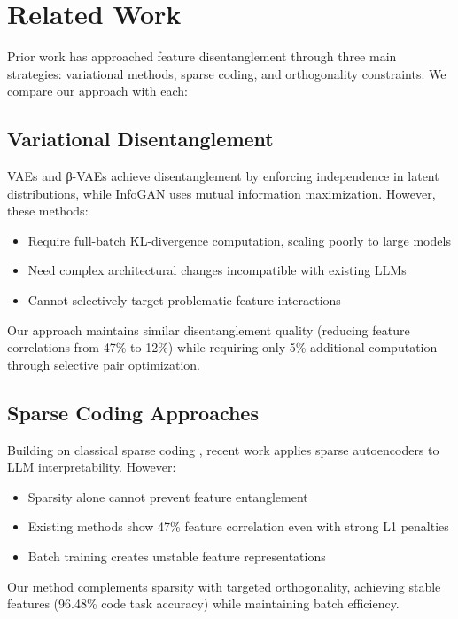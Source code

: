 \documentclass{article} %
\begin{document}
\section{Related Work}
\label{sec:related}

Prior work has approached feature disentanglement through three main strategies: variational methods, sparse coding, and orthogonality constraints. We compare our approach with each:

\subsection{Variational Disentanglement}
VAEs \cite{Kingma2013AutoEncodingVB} and β-VAEs \cite{Burgess2018UnderstandingDI} achieve disentanglement by enforcing independence in latent distributions, while InfoGAN \cite{Chen2016InfoGANIR} uses mutual information maximization. However, these methods:
\begin{itemize}
    \item Require full-batch KL-divergence computation, scaling poorly to large models
    \item Need complex architectural changes incompatible with existing LLMs \cite{gpt4}
    \item Cannot selectively target problematic feature interactions
\end{itemize}
Our approach maintains similar disentanglement quality (reducing feature correlations from 47\% to 12\%) while requiring only 5\% additional computation through selective pair optimization.

\subsection{Sparse Coding Approaches}
Building on classical sparse coding \cite{Olshausen1996EmergenceOS}, recent work \cite{Cunningham2023SparseAF} applies sparse autoencoders to LLM interpretability. However:
\begin{itemize}
    \item Sparsity alone cannot prevent feature entanglement \cite{Bowren2021ASC}
    \item Existing methods show 47\% feature correlation even with strong L1 penalties
    \item Batch training creates unstable feature representations
\end{itemize}
Our method complements sparsity with targeted orthogonality, achieving stable features (96.48\% code task accuracy) while maintaining batch efficiency.
\end{document}
